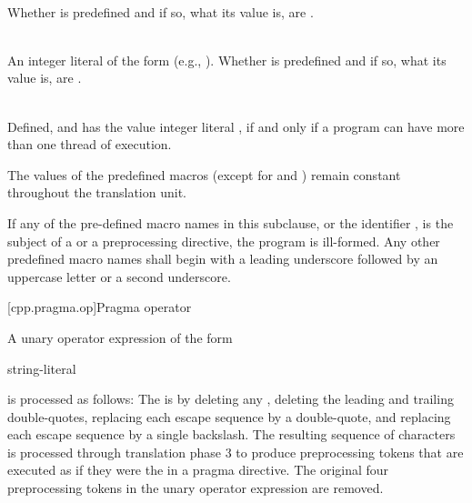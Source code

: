 \begin{description}
\item
{}%
\\
Whether  is predefined and if so, what its value is,
are .

\item
{}%
\\
An integer literal of the form 
(e.g., ).
Whether  is predefined and
if so, what its value is,
are .

\item
{}%
\\
Defined, and has the value integer literal , if and only if a program
can have more than one thread of execution.

\end{description}

\pnum
The values of the predefined macros
(except for
and
)
remain constant throughout the translation unit.

\pnum
If any of the pre-defined macro names in this subclause,
or the identifier
,
is the subject of a
or a
preprocessing directive,
the program is ill-formed.
Any other predefined macro names shall begin with a
leading underscore followed by an uppercase letter or a second
underscore.

[cpp.pragma.op]{Pragma operator}%
%

\pnum
A unary operator expression of the form
\begin{ncbnf}
 \terminal{(} string-literal \terminal{)}
\end{ncbnf}
is processed as follows: The  is 
by deleting any , deleting the leading and trailing
double-quotes, replacing each escape sequence  by a double-quote, and
replacing each escape sequence \tcode{\textbackslash\textbackslash} by a single
backslash. The resulting sequence of characters is processed through translation phase 3
to produce preprocessing tokens that are executed as if they were the
 in a pragma directive. The original four preprocessing
tokens in the unary operator expression are removed.

